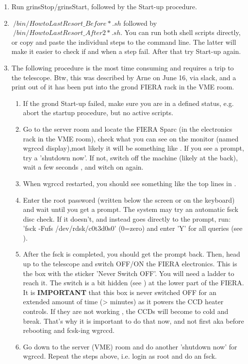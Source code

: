 \documentclass[11pt,fleqn,a4paper]{book}
\begin{document}
 \begin{enumerate}
 	\item Run grinsStop/grinsStart, followed by the Start-up procedure.
 	\item $~/bin/HowtoLastResort\_Before*.sh$ followed by  $~/bin/HowtoLastResort\_After2*.sh$. You can run both shell scripts directly, or  copy and paste the individual steps to the command line. The latter will make it easier to check if and when a step fail. After that try Start-up again.\\
 	\item The following procedure is the most time consuming and requires a trip to the telescope. Btw, this was described by Arne on June 16, via  slack, and a print out of it has been put into the \gls{grond} FIERA rack in the VME room.
 		\begin{enumerate}
 			\item If the \gls{grond} Start-up failed, make sure you are in a defined status, e.g. abort the startup procedure, but no active scripts.
 			\item Go to the server room and locate the FIERA Sparc (in the electronics rack in the VME room), check what you can see on the monitor (named wgrccd display),most likely it will be something like . If you see a prompt, try a 'shutdown now'. If not, switch off the machine (likely at the back), wait a few seconds , and witch on again.
 			\item When wgrccd restarted, you should see something like the top lines in .
 			\item Enter the root password (written below the screen or on the keyboard) and wait until you get a prompt.  The system may try an automatic fsck disc check. If it doesn't, and instead goes directly to the prompt, run: 'fsck -Fufs /dev/rdsk/c0t3d0s0' (0=zero) and enter 'Y' for all queries (see ).
 			\item After the fsck is completed, you should get the prompt back. Then, head up to the telescope and switch OFF/ON the FIERA electronics. This is the box with the sticker 'Never Switch OFF'. You will need a ladder to reach it. The switch is  a bit hidden (see ) at the lower part of the FIERA.  It is {\bf{IMPORTANT}} that this box is never switched OFF for an extended amount of time (> minutes) as it powers the CCD heater controls. If they are not working , the CCDs will become to cold and break. That's why it is important to do that now, and not first aka before rebooting and fcsk-ing wgrccd.
 			\item Go down to the server (VME) room and do another 'shutdown now' for wgrccd. Repeat the steps above, i.e. login as root and do an fsck.
 		\end{enumerate}
 \end{enumerate}
 
\end{document}

